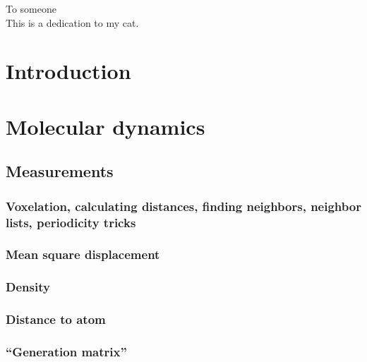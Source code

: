 \documentclass[twoside,english,a4paper]{uiofysmaster}
\begin{document}

\cleardoublepage

\begin{abstract}
\lipsum
\end{abstract}

\begin{dedication}
  To someone
  \\\vspace{12pt}
  This is a dedication to my cat.
\end{dedication}

\begin{acknowledgements}
  \lipsum
\end{acknowledgements}

\tableofcontents

\part{Introduction}

\part{Molecular dynamics}
    


\chapter{Measurements}
    \section{Voxelation, calculating distances, finding neighbors, neighbor lists, periodicity tricks\label{sec:voxelation}}
    \section{Mean square displacement}
    \section{Density}
    \section{Distance to atom}
    \section{``Generation matrix''}
\end{document}
